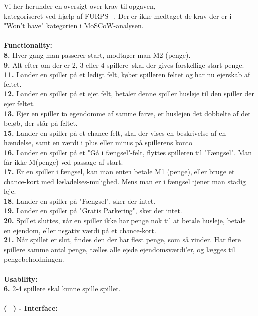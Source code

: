 \noindent Vi her herunder en oversigt over krav til opgaven, \\ kategoriseret ved hjælp af FURPS+. Der er ikke medtaget de krav der er i "Won't have" kategorien i MoSCoW-analysen.
\\\\\textbf{Functionality:}\\
    \textbf{8.} Hver gang man passerer start, modtager man M2 (penge). \\
    \textbf{9.} Alt efter om der er 2, 3 eller 4 spillere, skal der gives forskellige start-penge. \\
    \textbf{11.} Lander en spiller på et ledigt felt, køber spilleren feltet og har nu ejerskab af feltet. \\
    \textbf{12.} Lander en spiller på et ejet felt, betaler denne spiller husleje til den spiller der ejer feltet. \\
    \textbf{13.} Ejer en spiller to egendomme af samme farve, er huslejen det dobbelte af det beløb, der står på feltet. \\
    \textbf{15.} Lander en spiller på et chance felt, skal der vises en beskrivelse af en hændelse, samt en værdi i plus eller minus på spillerens konto. \\
    \textbf{16.}
    Lander en spiller på et "Gå i fængsel"-felt, flyttes spilleren til "Fængsel". Man får ikke M(penge) ved passage af start. \\
    \textbf{17.}
    Er en spiller i fængsel, kan man enten betale M1 (penge), eller bruge et chance-kort med løsladelses-mulighed. Mens man er i fængsel tjener man stadig leje. \\
    \textbf{18.} Lander en spiller på "Fængsel", sker der intet. \\
    \textbf{19.} Lander en spiller på "Gratis Parkering", sker der intet. \\
    \textbf{20.} Spillet sluttes, når en spiller ikke har penge nok til at betale husleje, betale en ejendom, eller negativ værdi på et chance-kort. \\
    \textbf{21.} Når spillet er slut, findes den der har flest penge, som så vinder. Har flere spillere samme antal penge, tælles alle ejede ejendomsværdi’er, og lægges til pengebeholdningen.
\\\\\textbf{Usability:}\\
    \textbf{6.} 2-4 spillere skal kunne spille spillet.
\\\\\textbf{(+) - Interface:}\\
